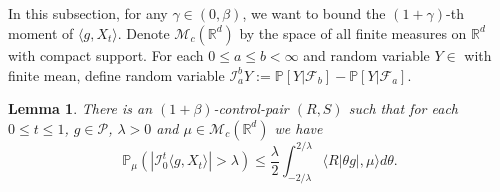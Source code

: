 \documentclass[12pt]{amsart}
\theoremstyle{plain}
\newtheorem{lem}[thm]{Lemma}
\theoremstyle{definition}
\numberwithin{equation}{section}
\begin{document}
\begin{comment}
    Therefore, for any $\mu\in \mathcal M(\mathbb R^d)$ with compact support, $k \in \mathbb{N}$, $\theta \in \mathbb{R}$ and $0\leq s\leq1$, using Jensen's inequality,
\begin{align*}
    &|\varphi_{k,\mu,s}(\theta)-1- \langle Z_{g_k}(s,\cdot, \theta),\mu\rangle|\\
    &\leq |\langle v_{g_k}(s,\cdot,\theta)-i\theta T_s^{\alpha}g_k, \mu \rangle|^2 + \langle |v_{g_k}(s,\cdot,\theta)-\tilde{v}_{g_k}(s,\cdot,\theta)|, \mu \rangle
    \\&\leq \langle |v_{g_k}(s,\cdot,\theta)-i\theta T_s^{\alpha}g_k|^2, \mu \rangle + \langle |v_{g_k}(s,\cdot,\theta)-\tilde{v}_{g_k}(s,\cdot,\theta)|, \mu \rangle
    \\&\leq e^{2\alpha}|C_g\theta e^{(\alpha-\kappa b)k+\alpha}|^{2+2\beta}\langle (\tilde R^g)^2,\mu\rangle + |C_g\theta e^{(\alpha-\kappa b)k}|^{1+2\beta}\langle R^g_1,\mu\rangle.
    \qedhere
\end{align*}
\end{proof}
\end{comment}

\subsection{}

 In this subsection, for any $\gamma \in (0,\beta)$, we want to bound the $(1+\gamma)$-th moment of $\langle g ,X_t \rangle$. Denote $\mathcal{M}_c(\mathbb{R}^d)$ by the space of all finite measures on $\mathbb{R}^d$ with compact support.
	For each $0 \leq a \leq b <\infty$ and  random variable $Y \in$ with finite mean, define random variable
$
   	\mathcal I_a^b Y
    := \mathbb P[Y|\mathscr F_b] - \mathbb P[Y|\mathscr F_a].
$
\begin{lem}
\label{lem: control pair for P(M>lambda)}
    There is an $(1+\beta)$-control-pair $(R,S)$ such that for each $0\leq t\leq 1$, $g\in \mathcal P$, $\lambda >0$ and $\mu\in \mathcal M_c(\mathbb R^d)$ we have
\[
    \mathbb P_\mu ( |\mathcal{I}_0^t\langle g,X_t\rangle| > \lambda)
    \leq \frac{\lambda}{2}\int_{-2/\lambda}^{2/\lambda}\langle R|\theta g|,\mu\rangle d\theta.
\]
\end{lem}
\end{document}
